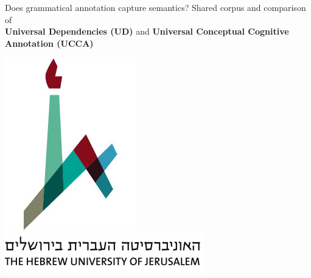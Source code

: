 \documentclass[extrafontsizes,60pt,twocolumn]{memoir}
\begin{document}
\begin{strip}
\begin{center}
\begin{minipage}[b]{.75\linewidth}
    \titlespacing*{\section}{0pt}{8mm}{.5in}
    \begin{adjustbox}{margin=.5in,frame,minipage=\textwidth,center}
      \centering\huge
      Does grammatical annotation capture semantics? \hfill
      Shared corpus and comparison of \\
      \HUGE
      \textbf{\color{red} Universal Dependencies (UD)} \hfill and \hfill
      \textbf{\color{blue} Universal Conceptual Cognitive Annotation (UCCA)}
    \end{adjustbox}
  \end{minipage}
  \hfill
  \begin{minipage}[b]{.09\linewidth}
    \hfill \includegraphics[width=.6\linewidth]{huji_logo.jpg} \\
    \includegraphics[width=\linewidth]{huji_banner.png}
    \vspace{-2.5in}
  \end{minipage}
  \end{center}
\end{strip}

\end{document}
